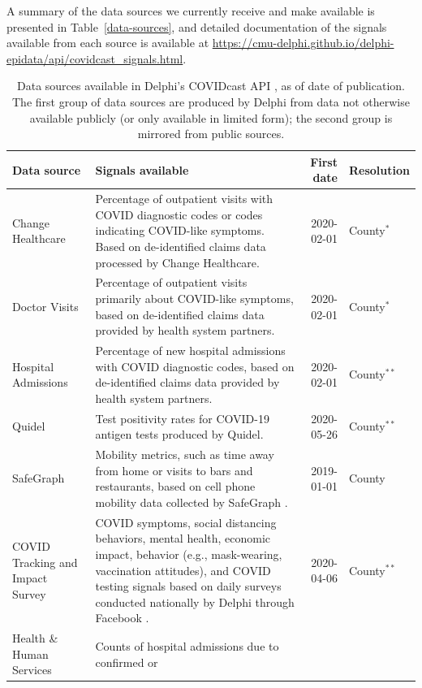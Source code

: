 \documentclass[9pt,twocolumn,twoside,lineno]{pnas-new}
\begin{document}
A summary of the data sources we currently receive and make available is
presented in Table~\ref{data-sources}, and detailed documentation of the signals
available from each source is available at
\url{https://cmu-delphi.github.io/delphi-epidata/api/covidcast_signals.html}.

\begin{table}
\centering
\caption{Data sources available in Delphi's COVIDcast API \cite{CovidcastAPI},
  as of date of publication. The first group of data sources are produced by
  Delphi from data not otherwise available publicly (or only available in
  limited form); the second group is mirrored from public sources.}
\begin{tabular}{>{\raggedright}p{1.2in} p{4.0in} r >{\raggedright\arraybackslash}p{0.5in}}\toprule
\textbf{Data source} & \textbf{Signals available} & \textbf{First date} &
\textbf{Resolution} \\\midrule
  Change Healthcare & Percentage of outpatient visits with COVID diagnostic codes
or codes indicating COVID-like symptoms. Based on de-identified claims data
processed by Change Healthcare. & 2020-02-01 & County$^*$ \\
  Doctor Visits & Percentage of outpatient visits primarily about COVID-like
symptoms, based on de-identified claims data provided by health system
partners. & 2020-02-01 & County$^*$ \\
  Hospital Admissions & Percentage of new hospital admissions with COVID
diagnostic codes, based on de-identified claims data provided by health system
partners. & 2020-02-01 & County$^{**}$\\
  Quidel & Test positivity rates for COVID-19 antigen tests produced by
Quidel. & 2020-05-26 & County$^{**}$ \\
  SafeGraph & Mobility metrics, such as time away from home or visits to bars
and restaurants, based on cell phone mobility data collected by SafeGraph
\cite{SafeGraphSD, SafeGraphPatterns}. & 2019-01-01 & County \\
 COVID Tracking and Impact Survey & COVID symptoms, social distancing behaviors,
mental health, economic impact, behavior (e.g., mask-wearing, vaccination
attitudes), and COVID testing signals based on daily surveys conducted
nationally by Delphi through Facebook \cite{DelphiSurvey, Kreuter:2020}. &
2020-04-06 & County$^{**}$ \\
  \midrule
  Health \& Human Services & Counts of hospital admissions due to confirmed or

\end{tabular}
\end{table}
\end{document}

